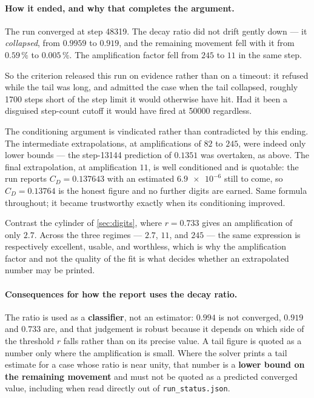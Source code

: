 \paragraph{How it ended, and why that completes the argument.} The run converged at step
\num{48319}. The decay ratio did not drift gently down --- it \emph{collapsed}, from
$0.9959$ to $0.919$, and the remaining movement fell with it from $0.59\,\%$ to
$0.005\,\%$. The amplification factor fell from $245$ to $11$ in the same step.

So the criterion released this run on evidence rather than on a timeout: it refused while
the tail was long, and admitted the case when the tail collapsed, roughly \num{1700} steps
short of the step limit it would otherwise have hit. Had it been a disguised step-count
cutoff it would have fired at \num{50000} regardless.

The conditioning argument is vindicated rather than contradicted by this ending. The
intermediate extrapolations, at amplifications of $82$ to $245$, were indeed only lower
bounds --- the step-\num{13144} prediction of $0.1351$ was overtaken, as above. The final
extrapolation, at amplification $11$, is well conditioned and is quotable: the run reports
$C_D=0.137643$ with an estimated $\num{6.9e-6}$ still to come, so
\textbf{$C_D=0.13764$} is the honest figure and no further digits are earned. Same
formula throughout; it became trustworthy exactly when its conditioning improved.

Contrast the cylinder of \cref{sec:digits}, where $r=0.733$ gives an amplification of only
$2.7$. Across the three regimes --- $2.7$, $11$, and $245$ --- the same expression is
respectively excellent, usable, and worthless, which is why the amplification factor and
not the quality of the fit is what decides whether an extrapolated number may be printed.

\paragraph{Consequences for how the report uses the decay ratio.} The ratio is used as a
\textbf{classifier}, not an estimator: $0.994$ is not converged, $0.919$ and $0.733$ are,
and that judgement is robust because it depends on which side of the threshold $r$ falls
rather than on its precise value. A tail figure is quoted as a number only where the
amplification is small. Where the solver prints a tail estimate for a case whose ratio is
near unity, that number is a \textbf{lower bound on the remaining movement} and must not
be quoted as a predicted converged value, including when read directly out of
\texttt{run\_status.json}.

